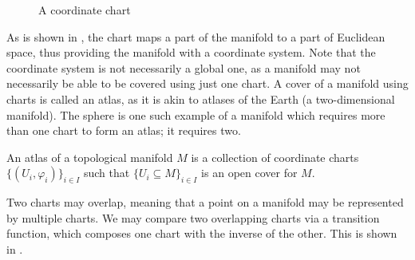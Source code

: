 \documentclass[a4paper,12pt]{article}
\begin{document}
\begin{figure}[!htbp]
    \centering
    \caption{A coordinate chart}\label{fig:coordinate_chart}
\end{figure}

As is shown in , the chart maps a part of the manifold to a part of Euclidean space, thus providing the manifold with a coordinate system.
Note that the coordinate system is not necessarily a global one, as a manifold may not necessarily be able to be covered using just one chart.
A cover of a manifold using charts is called an atlas, as it is akin to atlases of the Earth (a two-dimensional manifold).
The sphere is one such example of a manifold which requires more than one chart to form an atlas; it requires two.
\begin{definition}[Atlas]\label{def:atlas}
    An atlas of a topological manifold $M$ is a collection of coordinate charts $\{(U_i, \varphi_i)\}_{i \in I}$ such that $\{U_i \subseteq M\}_{i \in I}$ is an open cover for $M$.
\end{definition}
Two charts may overlap, meaning that a point on a manifold may be represented by multiple charts.
We may compare two overlapping charts via a transition function, which composes one chart with the inverse of the other.
This is shown in .
\end{document}
